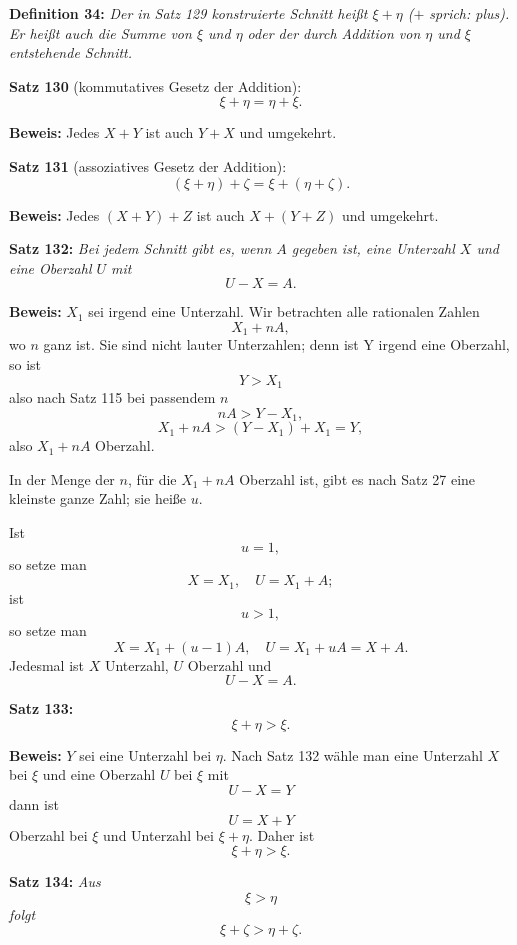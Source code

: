 
{\bf Definition 34:} {\it Der in Satz 129 konstruierte Schnitt hei{\ss}t $\xi + \eta$
{\rm ($+$ sprich: plus).}  Er hei{\ss}t auch die Summe von $\xi$ und $\eta$ oder der
durch Addition von $\eta$ und $\xi$ entstehende Schnitt.}
\medskip


{\bf Satz 130} (kommutatives Gesetz der Addition):
{\it $$\xi + \eta = \eta + \xi.$$}%

{\bf Beweis:} Jedes $X + Y$ ist auch $Y + X$ und umgekehrt.
\medskip


{\bf Satz 131} (assoziatives Gesetz der Addition):
{\it $$(\xi + \eta) + \zeta = \xi + (\eta + \zeta).$$}%

{\bf Beweis:} Jedes $(X + Y) + Z$ ist auch $X + (Y+ Z)$ und umgekehrt.
\medskip


{\bf Satz 132:} {\it Bei jedem Schnitt gibt es, wenn $A$ gegeben ist, eine
Unterzahl $X$ und eine Oberzahl $U$ mit
$$U - X = A.$$}%

{\bf Beweis:} $X_1$ sei irgend eine Unterzahl.  Wir betrachten alle
rationalen Zahlen
$$X_1 + nA,$$
wo $n$ ganz ist.  Sie sind nicht lauter Unterzahlen; denn ist Y
irgend eine Oberzahl, so ist
$$Y > X_1$$
also nach Satz 115 bei passendem $n$
$$nA > Y - X_1,$$
$$X_1 + nA > (Y - X_1) + X_1 = Y,$$
also $X_1 + nA$ Oberzahl.

In der Menge der $n$, f\"ur die $X_1 + nA$ Oberzahl ist, gibt es
nach Satz 27 eine kleinste ganze Zahl; sie hei{\ss}e $u$.

Ist
$$u = 1,$$
so setze man
$$X = X_1,\quad U = X_1 + A;$$
ist
$$u > 1,$$
so setze man
$$X = X_1 + (u - 1)A,\quad U = X_1 + uA = X + A.$$
Jedesmal ist $X$ Unterzahl, $U$ Oberzahl und
$$U - X = A.$$
\medskip


{\bf Satz 133:} {\it $$\xi + \eta > \xi.$$}%

{\bf Beweis:} $Y$ sei eine Unterzahl bei $\eta$.  Nach Satz 132 w\"ahle
man eine Unterzahl $X$ bei $\xi$ und eine Oberzahl $U$ bei $\xi$ mit
$$U - X = Y$$
dann ist
$$U = X + Y$$
Oberzahl bei $\xi$ und Unterzahl bei $\xi + \eta$.  Daher ist
$$\xi + \eta > \xi.$$
\medskip


{\bf Satz 134:} {\it Aus
$$\xi > \eta$$
folgt
$$\xi + \zeta > \eta + \zeta.$$}%

